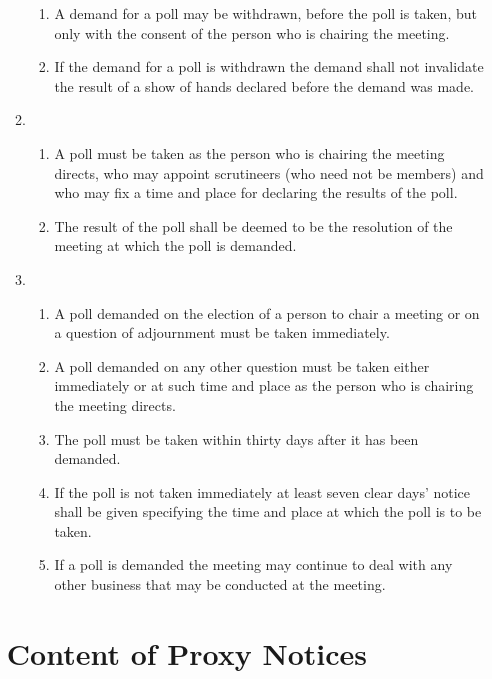 \begin{enumerate}
\begin{enumerate}
    \begin{enumerate}
    \item
      A demand for a poll may be withdrawn, before the poll is taken, but
      only with the consent of the person who is chairing the meeting.
    \item
      If the demand for a poll is withdrawn the demand shall not
      invalidate the result of a show of hands declared before the demand
      was made.
    \end{enumerate}
  \item


    \begin{enumerate}
    \item
      A poll must be taken as the person who is chairing the meeting
      directs, who may appoint scrutineers (who need not be members) and
      who may fix a time and place for declaring the results of the poll.
    \item
      The result of the poll shall be deemed to be the resolution of the
      meeting at which the poll is demanded.
    \end{enumerate}
  \item


    \begin{enumerate}
    \item
      A poll demanded on the election of a person to chair a meeting or
      on a question of adjournment must be taken immediately.
    \item
      A poll demanded on any other question must be taken either
      immediately or at such time and place as the person who is chairing
      the meeting directs.
    \item
      The poll must be taken within thirty days after it has been
      demanded.
    \item
      If the poll is not taken immediately at least seven clear days'
      notice shall be given specifying the time and place at which the
      poll is to be taken.
    \item
      If a poll is demanded the meeting may continue to deal with any
      other business that may be conducted at the meeting.
    \end{enumerate}
  \end{enumerate}

\section{Content of Proxy Notices}


\end{enumerate}
